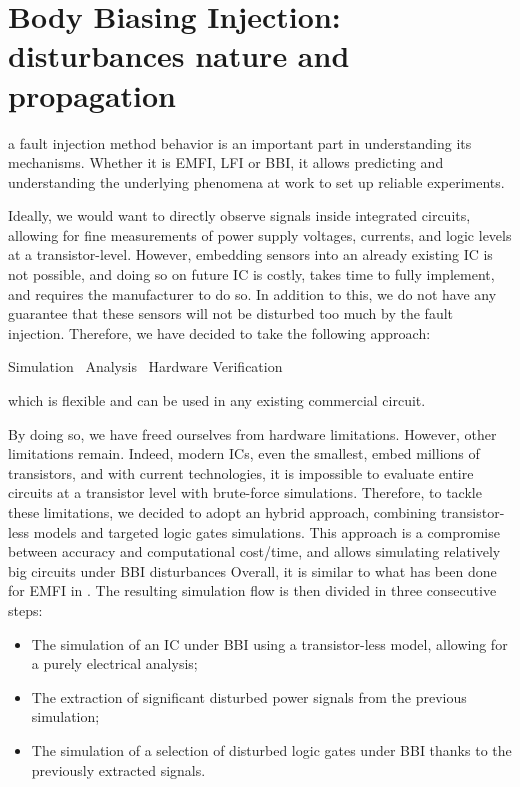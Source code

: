 
\section{Body Biasing Injection: disturbances nature and propagation}
 a fault injection method behavior is an important part in understanding its mechanisms.
Whether it is EMFI, LFI or BBI, it allows predicting and understanding the underlying phenomena at work to set up reliable experiments.

Ideally, we would want to directly observe signals inside integrated circuits, allowing for fine measurements of power supply voltages, currents, and logic levels at a transistor-level.
However, embedding sensors into an already existing IC is not possible, and doing so on future IC is costly, takes time to fully implement, and requires the manufacturer to do so.
In addition to this, we do not have any guarantee that these sensors will not be disturbed too much by the fault injection.
Therefore, we have decided to take the following approach:
\begin{center}
	Simulation \textrightarrow\ Analysis \textrightarrow\ Hardware Verification
\end{center}
which is flexible and can be used in any existing commercial circuit.

By doing so, we have freed ourselves from hardware limitations.
However, other limitations remain.
Indeed, modern ICs, even the smallest, embed millions of transistors, and with current technologies, it is impossible to evaluate entire circuits at a transistor level with brute-force simulations.
Therefore, to tackle these limitations, we decided to adopt an hybrid approach, combining transistor-less models and targeted logic gates simulations.
This approach is a compromise between accuracy and computational cost/time, and allows simulating relatively big circuits under BBI disturbances
Overall, it is similar to what has been done for EMFI in \cite{mathieuEMFI}.
The resulting simulation flow is then divided in three consecutive steps:
\begin{itemize}
	\item The simulation of an IC under BBI using a transistor-less model, allowing for a purely electrical analysis;
	\item The extraction of significant disturbed power signals from the previous simulation;
	\item The simulation of a selection of disturbed logic gates under BBI thanks to the previously extracted signals.
\end{itemize}

